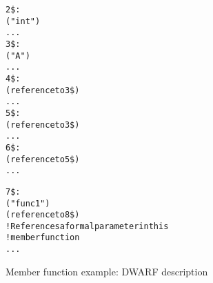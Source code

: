 \begin{figure}[ht]
\begin{dwflisting}
\begin{alltt}

2\$: \DWTAGbasetype
        \DWATname("int")
        ...
3\$: \DWTAGclasstype
        \DWATname("A")
        ...
4\$:     \DWTAGpointertype
            \DWATtype(reference to 3\$)
            ...
5\$:     \DWTAGconsttype
            \DWATtype(reference to 3\$)
            ...
6\$:     \DWTAGpointertype
            \DWATtype(reference to 5\$)
            ...

7\$:     \DWTAGsubprogram
            \DWATdeclaration
            \DWATname("func1")
            \DWATobjectpointer(reference to 8\$) 
                ! References a formal parameter in this 
                ! member function
            ...

\end{alltt}
\end{dwflisting}
\caption{Member function example: DWARF description}
\label{fig:memberfunctionexampledwarfdescription}
\end{figure}


